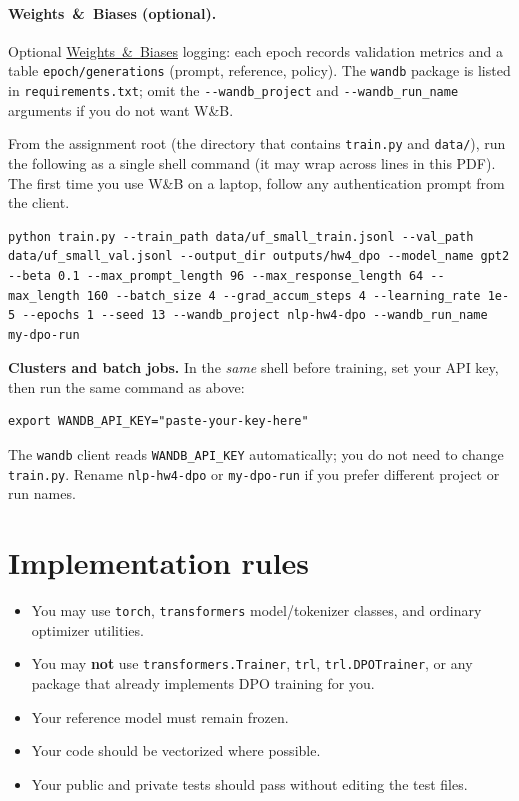 \documentclass[11pt]{article}
\begin{document}
\paragraph{Weights~\&~Biases (optional).}
Optional \href{https://wandb.ai}{Weights~\&~Biases} logging: each epoch records validation metrics and a table \texttt{epoch/generations} (prompt, reference, policy).
The \texttt{wandb} package is listed in \texttt{requirements.txt}; omit the \texttt{-{}-wandb\_project} and \texttt{-{}-wandb\_run\_name} arguments if you do not want W\&B.

{\footnotesize
From the assignment root (the directory that contains \texttt{train.py} and \texttt{data/}), run the following as a single shell command (it may wrap across lines in this PDF).
The first time you use W\&B on a laptop, follow any authentication prompt from the client.

\begin{lstlisting}[basicstyle=\ttfamily\footnotesize,breaklines=true,frame=single,columns=fullflexible]
python train.py --train_path data/uf_small_train.jsonl --val_path data/uf_small_val.jsonl --output_dir outputs/hw4_dpo --model_name gpt2 --beta 0.1 --max_prompt_length 96 --max_response_length 64 --max_length 160 --batch_size 4 --grad_accum_steps 4 --learning_rate 1e-5 --epochs 1 --seed 13 --wandb_project nlp-hw4-dpo --wandb_run_name my-dpo-run
\end{lstlisting}

\medskip
\noindent\textbf{Clusters and batch jobs.} In the \emph{same} shell before training, set your API key, then run the same command as above:
\begin{lstlisting}[basicstyle=\ttfamily\footnotesize,breaklines=true,frame=single,columns=fullflexible]
export WANDB_API_KEY="paste-your-key-here"
\end{lstlisting}
The \texttt{wandb} client reads \texttt{WANDB\_API\_KEY} automatically; you do not need to change \texttt{train.py}.
Rename \texttt{nlp-hw4-dpo} or \texttt{my-dpo-run} if you prefer different project or run names.
}

\section*{Implementation rules}

\begin{itemize}[itemsep=0.35em]
    \item You may use \texttt{torch}, \texttt{transformers} model/tokenizer classes, and ordinary optimizer utilities.
    \item You may \textbf{not} use \texttt{transformers.Trainer}, \texttt{trl}, \texttt{trl.DPOTrainer}, or any package that already implements DPO training for you.
    \item Your reference model must remain frozen.
    \item Your code should be vectorized where possible.
    \item Your public and private tests should pass without editing the test files.
\end{itemize}
\end{document}
